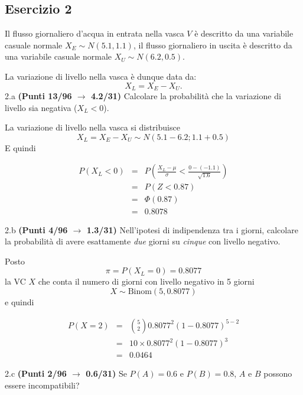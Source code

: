 \documentclass[
  11pt,
]{book}
\theoremstyle{mytheoremstyle}
\theoremstyle{mydefstyle}
\newenvironment{sol}
  {
  \begin{tcolorbox}[enhanced,breakable,arc=0.1mm,boxrule=1pt,colback=white,colframe=iblue,
  title=\bf \fontfamily{lmss}\selectfont \hspace{.5 cm} Soluzione,drop fuzzy shadow]

}{
\end{tcolorbox}
  }
\begin{document}
\subsection{Esercizio 2}\label{esercizio-2-4}

Il flusso giornaliero d'acqua in entrata nella vasca \(V\) è descritto da una variabile casuale normale \(X_E\sim N(5.1,1.1)\), il flusso giornaliero in uscita è descritto da una variabile casuale normale \(X_U\sim N(6.2,0.5)\).

La variazione di livello nella vasca è dunque data da:
\[
X_L=X_E-X_U.
\]
2.a \textbf{(Punti 13/96 \(\rightarrow\) 4.2/31)} Calcolare la probabilità che la variazione di livello sia negativa (\(X_L<0\)).

\begin{sol}
La variazione di livello nella vasca si distribuisce
\[
X_L=X_E-X_U\sim N(5.1-6.2;1.1+0.5)
\]
E quindi

\begin{eqnarray*}
      P( X_L   <   0 ) 
        &=& P\left(  \frac { X_L  -  \mu }{ \sigma }  <  \frac { 0  -  ( -1.1 ) }{\sqrt{ 1.6 }} \right)  \\
                 &=& P\left(  Z   <   0.87 \right) \\    
                 &=&  \Phi( 0.87 ) \\ &=&  0.8078 
      \end{eqnarray*}

\end{sol}

2.b \textbf{(Punti 4/96 \(\rightarrow\) 1.3/31)} Nell'ipotesi di indipendenza tra i giorni, calcolare la probabilità di avere esattamente \emph{due} giorni su \emph{cinque} con livello negativo.

\begin{sol}
Posto
\[
\pi = P(X_L=0)=0.8077
\]
la VC \(X\) che conta il numero di giorni con livello negativo in 5 giorni
\[
X\sim\text{Binom}(5,0.8077)
\]
e quindi

\normalsize 
\begin{eqnarray*}
      P( X = 2 ) &=& \binom{ 5 }{ 2 } 0.8077 ^{ 2 }(1- 0.8077 )^{ 5 - 2 } \\                 &=& 10 \times 0.8077 ^{ 2 }(1- 0.8077 )^{ 3 } \\                 &=& 0.0464 
   \end{eqnarray*}
\normalsize 

\end{sol}

2.c \textbf{(Punti 2/96 \(\rightarrow\) 0.6/31)} Se \(P(A)=0.6\) e \(P(B)=0.8\), \(A\) e \(B\) possono essere incompatibili?
\end{document}
